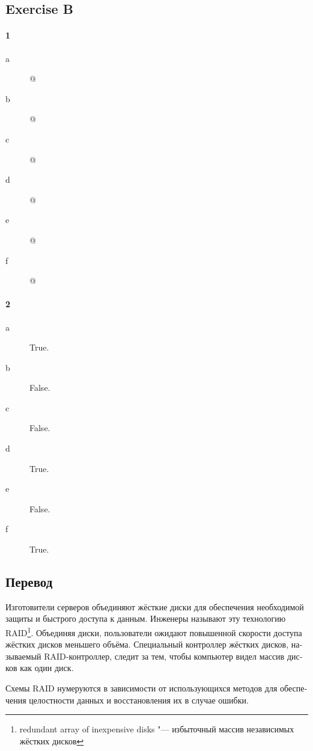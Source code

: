 \documentclass[a5paper,10pt,notitlepage,pdftex,headsepline]{scrartcl}
\makeatletter
\newcommand{\Rmnum}[1]{\expandafter\@slowromancap\romannumeral #1@}
\makeatother
\begin{document}
  \subsection{Exercise B}
    \begin{minipage}[t]{0.5\textwidth}
      \paragraph{1}
        \begin{description}
          \item[a] \Rmnum{3}
          \item[b] \Rmnum{5}
          \item[c] \Rmnum{4}
          \item[d] \Rmnum{6}
          \item[e] \Rmnum{2}
          \item[f] \Rmnum{1}
        \end{description}
    \end{minipage}
    \begin{minipage}[t]{0.5\textwidth}
      \paragraph{2}
        \begin{description}
          \item[a] True.
          \item[b] False.
          \item[c] False.
          \item[d] True.
          \item[e] False.
          \item[f] True.
        \end{description}
    \end{minipage}
  \subsection{Перевод}
    \begin{otherlanguage}{russian}
      Изготовители серверов объединяют жёсткие диски для обеспечения
      необходимой защиты и быстрого доступа к данным.
      Инженеры называют  эту технологию RAID\footnote{redundant array of
      inexpensive disks "--- избыточный массив независимых жёстких дисков}.
      Объединяя диски, пользователи ожидают повышенной скорости доступа
      жёстких дисков меньшего объёма.
      Специальный контроллер жёстких дисков, называемый RAID-контроллер,
      следит за тем, чтобы компьютер видел массив дисков как один диск.

      Схемы RAID нумеруются в зависимости от использующихся методов для
      обеспечения целостности данных и восстановления их в случае ошибки.
    \end{otherlanguage}
\end{document}
